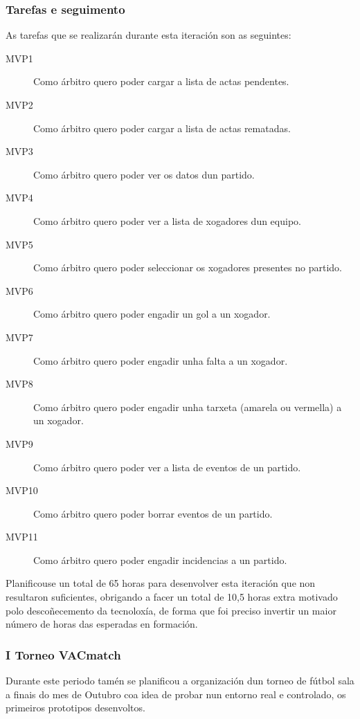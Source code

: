       \subsubsection{Tarefas e seguimento}

      As tarefas que se realizarán durante esta iteración son as seguintes:

        \begin{description}
        \item [MVP1] Como árbitro quero poder cargar a lista de actas pendentes.
        \item [MVP2] Como árbitro quero poder cargar a lista de actas rematadas.
        \item [MVP3]Como árbitro quero poder ver os datos dun partido.
        \item [MVP4]Como árbitro quero poder ver a lista de xogadores dun 
equipo.
        \item [MVP5] Como árbitro quero poder seleccionar os xogadores 
presentes no partido.
        \item [MVP6] Como árbitro quero poder engadir un gol a un xogador.
        \item [MVP7] Como árbitro quero poder engadir unha falta a un xogador.
        \item [MVP8] Como árbitro quero poder engadir unha tarxeta (amarela ou 
vermella) a un xogador.
        \item [MVP9] Como árbitro quero poder ver a lista de eventos de un 
partido.
        \item [MVP10] Como árbitro quero poder borrar eventos de un partido.
        \item [MVP11] Como árbitro quero poder engadir incidencias a un partido.
       \end{description}

      Planificouse un total de 65 horas para desenvolver esta iteración que non 
resultaron suficientes, obrigando a facer un total de 10,5 horas extra motivado 
polo descoñecemento da tecnoloxía, de forma que foi preciso invertir un maior 
número de horas das esperadas en formación.

    \subsubsection{I Torneo VACmatch}
    \label{sec:torneo_vacmatch}
    Durante este periodo tamén se planificou a organización dun torneo de 
  fútbol sala a finais do mes de Outubro coa idea de probar nun entorno real 
  e controlado, os primeiros prototipos desenvoltos.

